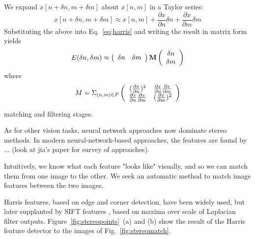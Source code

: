 We expand $x[n + \delta n, m + \delta m]$ about $x[n, m]$ in a Taylor series:
\begin{equation}
    x[n + \delta n, m + \delta m] \approx
    x[n, m] + \frac{\partial x}{\partial n} \delta n
    + \frac{\partial x}{\partial m} \delta m
\end{equation}
Substituting the above into Eq.~\ref{eq;harris} and writing the result in matrix form yields
\begin{equation}
       E(\delta n, \delta m) \approx
       \left( \begin{array}{c c}
       \delta n & \delta m
       \end{array}
       \right)
       \mathbf{M} 
       \left( \begin{array}{c}
       \delta n \\
       \delta m
       \end{array}
       \right) 
\end{equation}
where
\begin{equation}
M = \Sigma_{(n, m) \in P}
\left( \begin{array}{c c}
(\frac{\partial x}{\partial n})^2 & 
\frac{\partial x}{\partial n} 
\frac{\partial x}{\partial m} \\
\frac{\partial x}{\partial n} 
\frac{\partial x}{\partial m} 
& (\frac{\partial x}{\partial m})^2
\end{array} \right)
\end{equation}

matching and filtering stages.

As for other vision tasks, neural network approaches now dominate stereo methods.
In modern neural-network-based approaches, the features are found by ...  (look at jia's paper for survey of approaches).




Intuitively, we know what each feature "looks like" visually, and so we can match them from one image to the other. We seek an automatic method to match image features between the two images.

 Harris features, based on edge and corner detection, \cite{Harris88} have been widely used, but later supplanted by SIFT features \cite{Lowe04}, based on maxima over scale of Laplacian filter outputs.  Figure~\ref{fig:stereopoints}~(a) and (b) show the result of the Harris feature detector to the images of Fig.~\ref{fig:stereomatch}.


